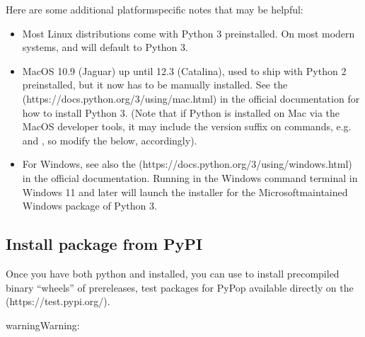 \documentclass[letterpaper,10pt,english,openany,oneside]{sphinxmanual}
\begin{document}
\sphinxAtStartPar
Here are some additional platform\sphinxhyphen{}specific notes that may be helpful:
\begin{itemize}
\item {} 
\sphinxAtStartPar
Most Linux distributions come with Python 3 preinstalled. On most
modern systems,  and  will default to Python 3.

\item {} 
\sphinxAtStartPar
MacOS 10.9 (Jaguar) up until 12.3 (Catalina), used to ship with
Python 2 pre\sphinxhyphen{}installed, but it now has to be manually installed.
See the  (https://docs.python.org/3/using/mac.html) in the official
documentation for how to install Python 3. (Note that if Python is
installed on Mac via the MacOS developer tools, it may include the
version  suffix on commands, e.g.  and , so
modify the below, accordingly).

\item {} 
\sphinxAtStartPar
For Windows, see also the  (https://docs.python.org/3/using/windows.html) in the official
documentation. Running  in the Windows command terminal
in Windows 11 and later will launch the installer for the
Microsoft\sphinxhyphen{}maintained Windows package of Python 3.

\end{itemize}


\subsection{Install package from PyPI}
\label{\detokenize{docs/guide-chapter-install:install-package-from-pypi}}
\sphinxAtStartPar
Once you have both python and  installed, you can use 
to install pre\sphinxhyphen{}compiled binary “wheels” of 
pre\sphinxhyphen{}releases, test packages for PyPop available directly on the  (https://test.pypi.org/).

\begin{sphinxadmonition}{warning}{Warning:}
\sphinxAtStartPar
{}
\end{sphinxadmonition}
\end{document}
